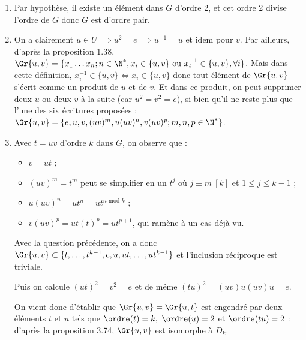 \begin{enumerate}
  \item  Par hypothèse, il existe un élément dans $G$ d'ordre 2, et cet ordre 2 divise l'ordre de $G$ donc $G$ est d'ordre pair.
  \item On a clairement $u\in U\implies u^2 = e \implies u^{-1}=u$ et idem pour $v$.
  Par ailleurs, d'après la proposition 1.38, $\Gr{u,v} = \{x_1\ldots x_n ; n\in \N^*, x_i \in \{u,v\} \text{ ou } x_i^{-1} \in \{u,v\}, \forall i\}$. Mais dans cette définition, $x_i^{-1} \in \{u,v\}\iff x_i \in \{u,v\}$ donc tout élément de $\Gr{u,v}$ s'écrit comme un produit de $u$ et de $v$. Et dans ce produit, on peut supprimer deux $u$ ou deux $v$ à la suite (car $u^2 =v^2=e$), si bien qu'il ne reste plus que l'une des six écritures proposées :
  $\Gr{u,v} = \{e, u, v, (uv)^m, u(uv)^n, v(uv)^p ; m,n,p\in \N^*\}$.
  \item Avec $t=uv$ d'ordre $k$ dans $G$, on observe que :
  \begin{itemize}
   \item $v = ut$ ;
   \item $(uv)^m = t^m$ peut se simplifier en un $t^j$ où $j\equiv m~[k]$ et $1\leqslant j\leqslant k-1$ ;
   \item $u(uv)^n = ut^n = ut^{n \text{ mod } k}$ ;
   \item $v(uv)^p = ut(t)^p = ut^{p+1}$, qui ramène à un cas déjà vu.
  \end{itemize}
Avec la question précédente, on a donc $\Gr{u,v} \subset \{t,\ldots, t^{k-1}, e, u, ut,\ldots, ut^{k-1}\}$ et l'inclusion réciproque est triviale.

Puis on calcule $(ut)^2 = v^2 = e$ et de même $(tu)^2 =(uv)u(uv)u = e$.

On vient donc d'établir que $\Gr{u,v} = \Gr{u,t}$ est engendré par deux éléments $t$ et $u$ tels que $\ordre(t)=k,~ \ordre(u)=2$ et $\ordre(tu)=2$ : d'après la proposition 3.74, $\Gr{u,v}$ est isomorphe à $D_k$.

\end{enumerate}

